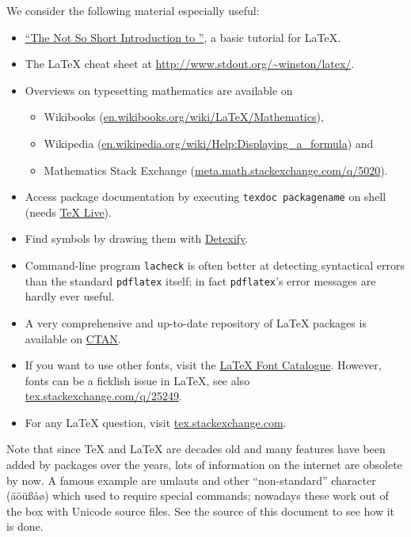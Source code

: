 \documentclass[]{tukseminar}
\begin{document}
We consider the following material especially useful:
\begin{itemize}
	\item \href{http://mirrors.concertpass.com/tex-archive/info/lshort/english/lshort.pdf}{``The Not So Short Introduction to \LaTeXe''}, a basic tutorial for \LaTeX{}.
	\item The \LaTeX{} cheat sheet at \url{http://www.stdout.org/~winston/latex/}.
	\item Overviews on typesetting mathematics are available on
	  \begin{itemize}
	    \item Wikibooks (\href{http://en.wikibooks.org/wiki/LaTeX/Mathematics}{en.wikibooks.org/wiki/LaTeX/Mathematics}),
	    \item Wikipedia (\href{http://en.wikipedia.org/wiki/Help:Displaying_a_formula}{en.wikipedia.org/wiki/Help:Displaying\_a\_formula}) and
	    \item Mathematics Stack Exchange (\href{http://meta.math.stackexchange.com/q/5020/3330}{meta.math.stackexchange.com/q/5020}).
	  \end{itemize}
	\item Access package documentation by executing \texttt{texdoc packagename} on shell (needs
	\href{https://www.tug.org/texlive/}{TeX Live}).
	\item Find symbols by drawing them with \href{http://detexify.kirelabs.org}{Detexify}.
	\item Command-line program \texttt{lacheck} is often better at detecting syntactical errors than the standard \texttt{pdflatex}
	itself; in fact \texttt{pdflatex}'s error messages are hardly ever useful.
	\item A very comprehensive and up-to-date repository of \LaTeX{} packages is
	  available on \href{http://ctan.org/}{CTAN}.
	\item If you want to use other fonts, visit the \href{http://www.tug.dk/FontCatalogue/}{\LaTeX{} Font Catalogue}. However, fonts can be a ficklish issue in \LaTeX{}, see also
	  \href{http://tex.stackexchange.com/q/25249/3213}{tex.stackexchange.com/q/25249}.
	\item For any \LaTeX{} question, visit \href{http://tex.stackexchange.com}{tex.stackexchange.com}.
\end{itemize}
Note that since \TeX{} and \LaTeX{} are decades old and many features have been added by packages over the years, lots of information on the internet are obsolete by now.
A famous example are umlauts and other ``non-standard'' character  (äöüßåø) which used to require special commands; nowadays these work out of the box with Unicode source files.
See the source of this document to see how it is done.
\end{document}
